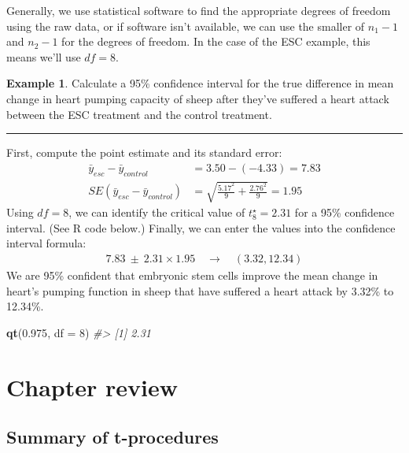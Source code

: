 \documentclass[
  10pt,
  openany]{book}
\newenvironment{Shaded}{\begin{snugshade}}{\end{snugshade}}
\newcommand{\AttributeTok}[1]{\textcolor[rgb]{0.13,0.29,0.53}{#1}}
\newcommand{\CommentTok}[1]{\textcolor[rgb]{0.56,0.35,0.01}{\textit{#1}}}
\newcommand{\DecValTok}[1]{\textcolor[rgb]{0.00,0.00,0.81}{#1}}
\newcommand{\FloatTok}[1]{\textcolor[rgb]{0.00,0.00,0.81}{#1}}
\newcommand{\FunctionTok}[1]{\textcolor[rgb]{0.13,0.29,0.53}{\textbf{#1}}}
\newcommand{\NormalTok}[1]{#1}
\theoremstyle{definition}
\theoremstyle{definition}
\newtheorem{example}{Example}[chapter]
\theoremstyle{definition}
\theoremstyle{definition}
\theoremstyle{remark}
\begin{document}
Generally, we use statistical software to find the appropriate
degrees of freedom using the raw data, or if software isn't available,
we can use the smaller
of \(n_1 - 1\) and \(n_2 - 1\) for the degrees of freedom.
In the case of the ESC example, this means we'll use \(df = 8\).

\begin{example}
Calculate a 95\% confidence interval for the
true difference in mean change in heart pumping capacity of
sheep after they've suffered a heart attack between the ESC treatment and the control treatment.

\begin{center}\rule{0.5\linewidth}{0.5pt}\end{center}

First, compute the point estimate and its standard error:
\begin{align*}
  \bar{y}_{esc} - \bar{y}_{control} &= 3.50 - (-4.33) = 7.83\\   
  SE(\bar{y}_{esc} - \bar{y}_{control}) &= \sqrt{\frac{5.17^2}{9} + \frac{2.76^2}{9}} = 1.95
  \end{align*}
Using \(df = 8\), we can identify the
critical value of \(t^{\star}_{8} = 2.31\)
for a 95\% confidence interval. (See R code below.)
Finally, we can enter the values into the confidence
interval formula:
\begin{align*}
   7.83 \ \pm\ 2.31\times 1.95
    \quad\rightarrow\quad (3.32, 12.34)
  \end{align*}
We are 95\% confident that embryonic stem cells improve
the mean change in heart's pumping function in sheep that have suffered
a heart attack by 3.32\% to 12.34\%.
\end{example}

\begin{Shaded}
\begin{Highlighting}[]
\FunctionTok{qt}\NormalTok{(}\FloatTok{0.975}\NormalTok{, }\AttributeTok{df =} \DecValTok{8}\NormalTok{)}
\CommentTok{\#\textgreater{} [1] 2.31}
\end{Highlighting}
\end{Shaded}


\section{Chapter review}\label{chp19-review}

\subsection*{Summary of t-procedures}\label{summary-of-t-procedures}
\end{document}
